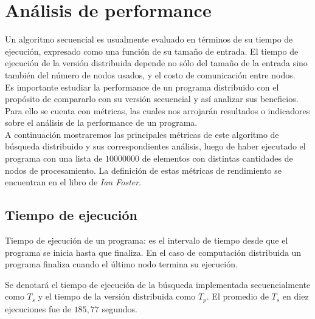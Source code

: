 \section{Análisis de performance}

Un algoritmo secuencial es usualmente evaluado en términos de su tiempo de ejecución, expresado como una función de su tamaño de entrada. El
tiempo de ejecución de la versión distribuida depende no sólo del tamaño de la entrada sino también del número de nodos usados, y el costo
de comunicación entre nodos.\\

Es importante estudiar la performance de un programa distribuido con el propósito de compararlo con su versión secuencial y así analizar
sus beneficios. Para ello se cuenta con métricas, las cuales nos arrojarán resultados o indicadores sobre el análisis de la performance de
un programa.\\

A continuación mostraremos las principales métricas de este algoritmo de búsqueda distribuido y sus correspondientes análisis, luego de
haber ejecutado el programa con una lista de $10000000$ de elementos con distintas cantidades de nodos de procesamiento. La definición de
estas métricas de rendimiento se encuentran en el libro de \textit{Ian Foster}\cite{parallel}.\\


\subsection{Tiempo de ejecución}

Tiempo de ejecución de un programa: es el intervalo de tiempo desde que el programa se inicia hasta que finaliza. En el caso de
computación distribuida un programa finaliza cuando el último nodo termina su ejecución.

Se denotará el tiempo de ejecución de la búsqueda implementada secuencialmente como $T_s$ y el tiempo de la versión distribuida como
$T_p$. El promedio de $T_s$ en diez ejecuciones fue de $185,77$ segundos.

